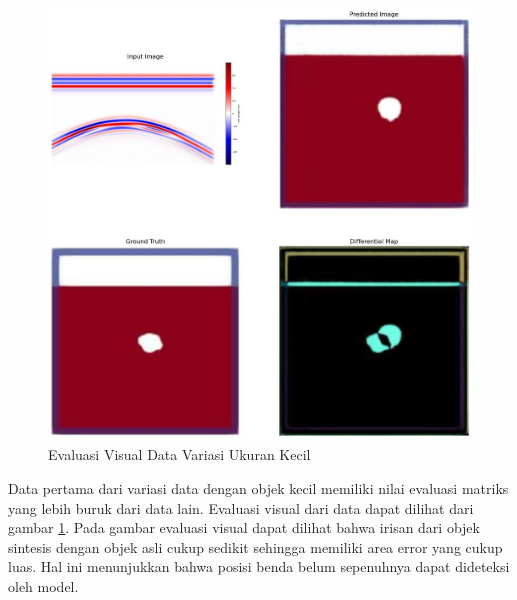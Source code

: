 \documentclass[conference]{IEEEtran}
\begin{document}
\begin{figure}[ht]
  \centering
  \includegraphics[scale=0.15]{gambar/diffMapKecil.jpg}
  \caption{Evaluasi Visual Data Variasi Ukuran Kecil}
  \label{fig:diffmapkecil}
\end{figure}

Data pertama dari variasi data dengan objek kecil memiliki nilai evaluasi matriks yang lebih buruk dari data lain. 
Evaluasi visual dari data dapat dilihat dari gambar \ref{fig:diffmapkecil}. 
Pada gambar evaluasi visual dapat dilihat bahwa irisan dari objek sintesis dengan objek asli cukup sedikit sehingga memiliki area error yang cukup luas. 
Hal ini menunjukkan bahwa posisi benda belum sepenuhnya dapat dideteksi oleh model.
\end{document}
